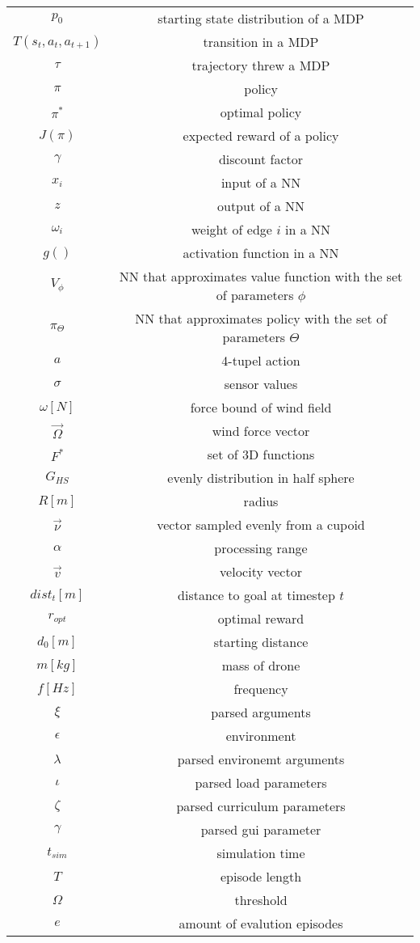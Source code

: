 \documentclass[bachelor,english]{infothesis}
\begin{document}
\begin{longtable}{|c|c|}
	$p_0$ & starting state distribution of a MDP\\
	$T(s_t, a_t, a_{t+1}) $ & transition in a MDP\\
	$\tau$ & trajectory threw a MDP\\
	$\pi $ & policy\\
	$\pi^*$ & optimal policy\\
	$J(\pi)$ & expected reward of a policy \\
	$\gamma$ & discount factor\\
		\hline
		\newpage
	\hline
	$x_i$ & input of a NN\\
	$z$ &  output of a NN\\
	$\omega_i$ & weight of edge $i$ in a NN\\
	$g()$ & activation function in a NN\\
	$V_{\phi}$ & NN that approximates value function with the set of parameters $\phi$\\
	$\pi_{\Theta}$ & NN that approximates policy with the set of parameters $\Theta$\\
	$a$ & 4-tupel action\\
	$\sigma$ & sensor values\\
	\hline
	\hline
	$\omega[N]$ & force bound of wind field\\
	$\overrightarrow{\Omega}$ & wind force vector\\
	$F^*$ & set of 3D functions\\
	$G_{HS}$ & evenly distribution in half sphere\\
	$R[m]$ & radius\\
	$\overrightarrow{\nu}$ & vector sampled evenly from a cupoid\\
	$\alpha$ & processing range \\
	$\overrightarrow{v}$ & velocity vector\\ 
	$dist_t[m]$ & distance to goal at timestep $t$\\
	$r_{opt}$ & optimal reward\\
	$d_0[m]$ & starting distance\\
	$m[kg]$ & mass of drone\\
	$f[Hz]$ & frequency\\
	$\xi$ & parsed arguments\\
	$\epsilon$ & environment \\
	$\lambda$ & parsed environemt arguments\\
	$\iota$ & parsed load parameters\\
	$\zeta$ & parsed curriculum parameters\\
	$\gamma$ & parsed gui parameter\\
	$t_{sim}$ & simulation time \\
	$T$ & episode length\\
	$\Omega$ & threshold\\
	$e$ & amount of evalution episodes\\
	\hline
\end{longtable}
\newpage
\end{document}
